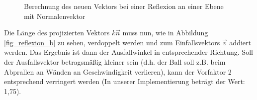     \begin{figure}
	\begin{center}
    \hspace{1.5cm}%
    \caption{Berechnung des neuen Vektors bei einer Reflexion an einer Ebene mit Normalenvektor}
        \label{fig_reflexion}
	\end{center}
    \end{figure}
    
Die Länge des projizierten Vektors $k\vec{n}$ muss nun, wie in Abbildung \ref{fig_reflexion_b} zu sehen, verdoppelt werden und zum Einfallsvektors $\vec{v}$ addiert werden. Das Ergebnis ist dann der Ausfallwinkel in entsprechender Richtung. Soll der Ausfallsvektor betragsmäßig kleiner sein (d.h. der Ball soll z.B. beim Abprallen an Wänden an Geschwindigkeit verlieren), kann der Vorfaktor 2 entsprechend verringert werden (In unserer Implementierung beträgt der Wert: 1,75).